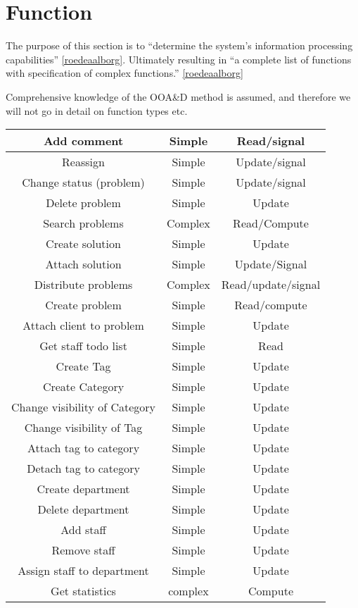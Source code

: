 \section{Function}
The purpose of this section is to ``determine the system's information processing capabilities'' \ref{roedeaalborg}. Ultimately resulting in ``a complete list of functions with specification of complex functions.'' 
\ref{roedeaalborg}

Comprehensive knowledge of the OOA\&D method is assumed, and therefore we will not go in detail on function types etc. 

\begin{table}[h] %

\begin{center}
\begin{tabular}{|c|c|c|}
\hline
Add comment &   Simple & Read/signal   \\ \hline%
Reassign & Simple   & Update/signal \\ \hline%
Change status (problem) &   Simple & Update/signal \\ \hline%
Delete problem & Simple &   Update \\   \hline%
Search problems & Complex &   Read/Compute \\ \hline%
Create solution & Simple &   Update \\   \hline%
Attach solution & Simple &   Update/Signal \\   \hline%
Distribute problems &   Complex & Read/update/signal \\   \hline%
Create problem &   Simple & Read/compute \\   \hline%
Attach client to problem & Simple & Update \\ \hline%
Get staff todo list & Simple & Read \\   \hline%
Create Tag & Simple &   Update \\ \hline%
Create Category & Simple & Update \\ \hline%
Change visibility of Category &   Simple &   Update \\   \hline%
Change visibility of Tag &   Simple &  Update \\ \hline%
Attach tag to category & Simple & Update \\ \hline%
Detach tag to category & Simple & Update \\ \hline%
Create department & Simple & Update \\ \hline%
Delete department & Simple & Update \\ \hline%
Add staff & Simple & Update \\ \hline%
Remove staff & Simple & Update \\ \hline%
Assign staff to department & Simple & Update \\ \hline%
Get statistics & complex & Compute \\ \hline%


\end{tabular}
\end{center}
\end{table}
